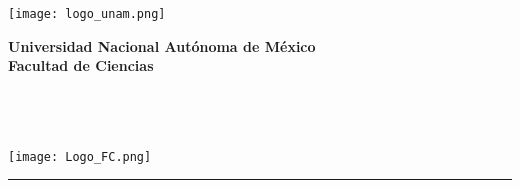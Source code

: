
\begin{center}
    \begin{minipage}{3cm}
        \begin{center}
            \texttt{[image: logo\_unam.png]}
        \end{center}
    \end{minipage}\hfill
    \begin{minipage}{10cm}
        \begin{center}
            \textbf{\large Universidad Nacional Autónoma de México}\\[0.1cm]
            \textbf{Facultad de Ciencias}\\[0.1cm]
            \textbf{\materia}\\[0.1cm]
            \tarea\\[0.1cm]
            \autor\\[0.1cm]
            \fecha
        \end{center}
    \end{minipage}\hfill
    \begin{minipage}{3cm}
        \begin{center}
            \texttt{[image: Logo\_FC.png]}
        \end{center}
    \end{minipage}
\end{center}

\noindent\rule{\textwidth}{0.01cm}
